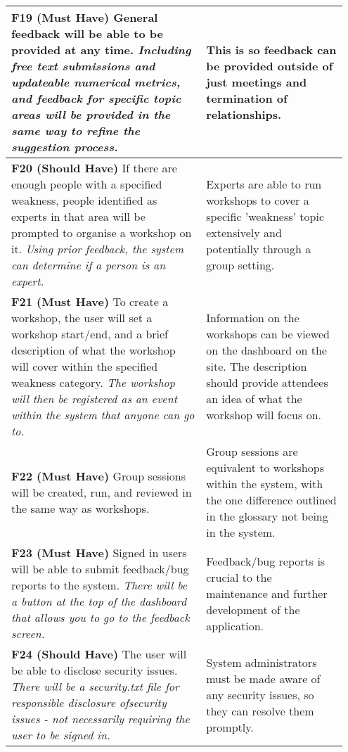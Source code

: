 \documentclass[10pt]{article}
\begin{document}
\begin{longtable}{|p{0.55\linewidth}|p{0.4\linewidth}|}
    \textbf{F19 (Must Have) }
    General feedback will be able to be provided at any time.
    \textit{Including free text submissions and updateable numerical metrics,
    and feedback for specific topic areas will be provided in the same way to
    refine the suggestion process.}
        &
    This is so feedback can be provided outside of just meetings and termination
    of relationships.
    \\ \hline

    \textbf{F20 (Should Have) }
    If there are enough people with a specified weakness, people identified as
    experts in that area will be prompted to organise a workshop on it.
    \textit{Using prior feedback, the system can determine if a person is an
    expert.}
        &
    Experts are able to run workshops to cover a specific 'weakness' topic
    extensively and potentially through a group setting.
    \\ \hline

    \textbf{F21 (Must Have) }
    To create a workshop, the user will set a workshop start/end, and a brief
    description of what the workshop will cover within the specified weakness
    category.
    \textit{The workshop will then be registered as an event within the system
    that anyone can go to.}
        &
    Information on the workshops can be viewed on the dashboard on the site. The
    description should provide attendees an idea of what the workshop will focus
    on.
    \\ \hline

    \textbf{F22 (Must Have) }
    Group sessions will be created, run, and reviewed in the same way as
    workshops.
        &
    Group sessions are equivalent to workshops within the system, with the one
    difference outlined in the glossary not being in the system.
    \\ \hline

    \textbf{F23 (Must Have) }
    Signed in users will be able to submit feedback/bug reports to the system.
    \textit{There will be a button at the top of the dashboard that allows you
    to go to the feedback screen.}
        &
    Feedback/bug reports is crucial to the maintenance and further development
    of the application.
    \\ \hline

    \textbf{F24 (Should Have) }
    The user will be able to disclose security issues.
    \textit{There will be a security.txt file \cite{security_txt} for
    responsible disclosure ofsecurity issues - not necessarily requiring the
    user to be signed in.}
        &
    System administrators must be made aware of any security issues, so they can
    resolve them promptly.
    \\ \hline


\end{longtable}
\end{document}
